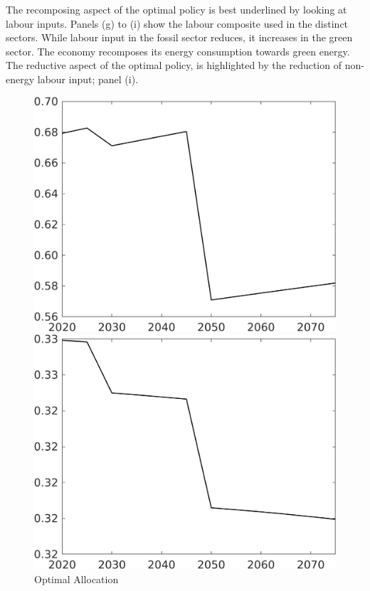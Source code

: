 The recomposing aspect of the optimal policy is best underlined by looking at labour inputs. Panels (g) to (i) show the labour composite used in the distinct sectors. While labour input in the fossil sector reduces, it increases in the green sector. The economy recomposes its energy consumption towards green energy. The reductive aspect of the optimal policy, is highlighted by the reduction of non-energy labour input; panel (i). 
\begin{figure}[h!!]
	\centering
	\caption{Optimal Allocation }\label{fig:optAll}
	
	
	\begin{minipage}[]{0.32\textwidth}
		\includegraphics[width=1\textwidth]{../../codding_model/own_basedOnFried/optimalPol_elastS_DisuSci/figures/all_1705/Single_OPT_T_NoTaus_C_spillover0_sep1_BN0_ineq0_etaa0.79.png}
	\end{minipage}
	\begin{minipage}[]{0.32\textwidth}
		\includegraphics[width=1\textwidth]{../../codding_model/own_basedOnFried/optimalPol_elastS_DisuSci/figures/all_1705/Single_OPT_T_NoTaus_hl_spillover0_sep1_BN0_ineq0_etaa0.79.png}

\end{minipage}
\end{figure}
